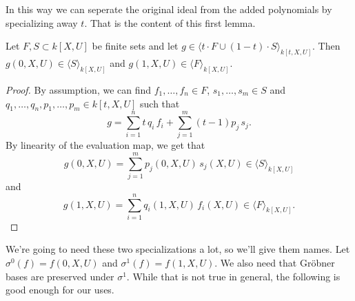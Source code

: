 \documentclass[a4paper, 12pt]{article}
\theoremstyle{changedot}
\theoremstyle{changedotbreak}
\theoremstyle{nonumberplain}
\newtheorem{proof}{Proof}
\begin{document}
In this way we can seperate the original ideal from the added polynomials by specializing away $t$. That is the content of this first lemma.

\begin{lemma}\label{lem:seperation}
  Let $F, S \subset k[X, U]$ be finite sets and let $g \in \langle t\cdot F \cup (1-t)\cdot S \rangle_{k[t, X, U]}$. Then $g(0, X, U) \in \langle S \rangle_{k[X, U]}$ and $g(1, X, U) \in \langle F \rangle_{k[X, U]}$.
\end{lemma}
\begin{proof}
  By assumption, we can find $f_{1}, \dots, f_{n} \in F$, $s_{1}, \dots, s_{m} \in S$ and $q_{1}, \dots, q_{n}, p_{1}, \dots, p_{m} \in k[t, X, U]$ such that
  \[g = \sum_{i=1}^{n} t\, q_{i}\, f_{i} + \sum_{j=1}^{m} (t-1) p_{j}\, s_{j}.\]
  By linearity of the evaluation map, we get that
  \[g(0, X, U) = \sum_{j=1}^{m} p_{j}(0, X, U)\, s_{j}(X, U) \in \langle S \rangle_{k[X, U]}\]
  and
  \[g(1, X, U) = \sum_{i=1}^{n} q_{i}(1, X, U)\, f_{i}(X, U) \in \langle F \rangle_{k[X, U]}.\]
\end{proof}

We're going to need these two specializations a lot, so we'll give them names. Let $\sigma^{0}(f) = f(0, X, U)$ and $\sigma^{1}(f) = f(1, X, U)$. We also need that Gröbner bases are preserved under $\sigma^{1}$. While that is not true in general, the following is good enough for our uses.
\end{document}

